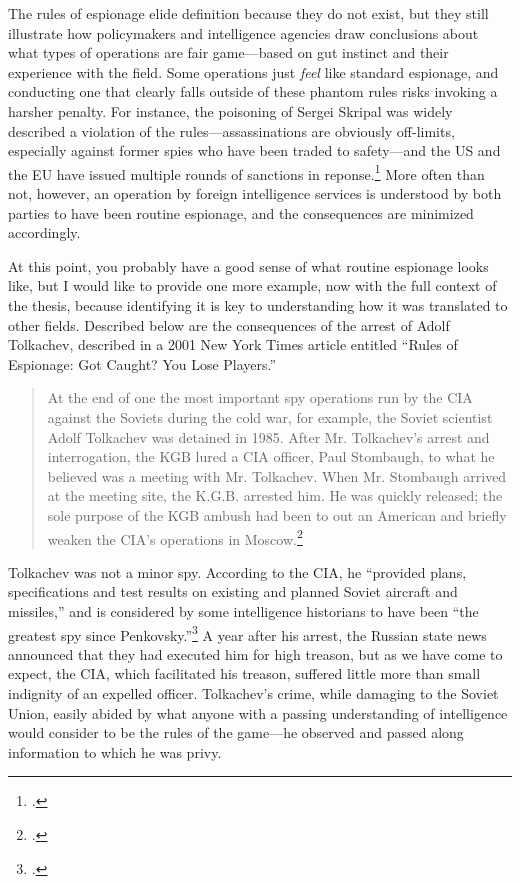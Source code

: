 \documentclass{report}
\begin{document}
The rules of espionage elide definition because they do not exist, but they still illustrate how policymakers and intelligence agencies draw conclusions about what types of operations are fair game---based on gut instinct and their experience with the field. Some operations just \emph{feel} like standard espionage, and conducting one that clearly falls outside of these phantom rules risks invoking a harsher penalty. For instance, the poisoning of Sergei Skripal was widely described a violation of the rules---assassinations are obviously off-limits, especially against former spies who have been traded to safety---and the US and the EU have issued multiple rounds of sanctions in reponse.\footcite{reuters_e.u._2019} More often than not, however, an operation by foreign intelligence services is understood by both parties to have been routine espionage, and the consequences are minimized accordingly.

At this point, you probably have a good sense of what routine espionage looks like, but I would like to provide one more example, now with the full context of the thesis, because identifying it is key to understanding how it was translated to other fields. Described below are the consequences of the arrest of Adolf Tolkachev, described in a 2001 New York Times article entitled ``Rules of Espionage: Got Caught? You Lose Players.''

\begin{quote}
At the end of one the most important spy operations run by the CIA against the Soviets during the cold war, for example, the Soviet scientist Adolf Tolkachev was detained in 1985. After Mr. Tolkachev's arrest and interrogation, the KGB lured a CIA officer, Paul Stombaugh, to what he believed was a meeting with Mr. Tolkachev. When Mr. Stombaugh arrived at the meeting site, the K.G.B. arrested him. He was quickly released; the sole purpose of the KGB ambush had been to out an American and briefly weaken the CIA's operations in Moscow.\footcite{risen_rules_2001}
\end{quote}
Tolkachev was not a minor spy. According to the CIA, he ``provided plans, specifications and test results on existing and planned Soviet aircraft and missiles,'' and is considered by some intelligence historians to have been ``the greatest spy since Penkovsky.''\footcite{cia_look_2008} A year after his arrest, the Russian state news announced that they had executed him for high treason, but as we have come to expect, the CIA, which facilitated his treason, suffered little more than small indignity of an expelled officer. Tolkachev's crime, while damaging to the Soviet Union, easily abided by what anyone with a passing understanding of intelligence would consider to be the rules of the game---he observed and passed along information to which he was privy.
\end{document}
